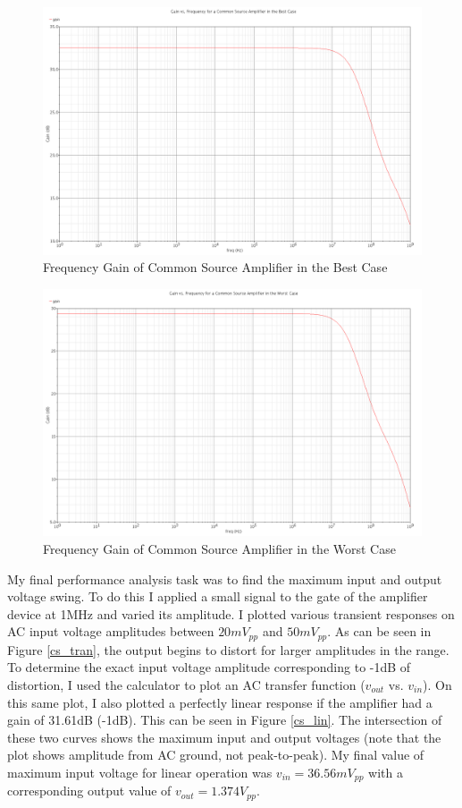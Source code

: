 \documentclass{article}
\begin{document}
\begin{figure}[H]
\centering
\includegraphics[width=6in]{2_cs_gain_ff.png}
\caption{Frequency Gain of Common Source Amplifier in the Best Case}
\label{cs_ff}
\end{figure}

\begin{figure}[H]
\centering
\includegraphics[width=6in]{2_cs_gain_ss.png}
\caption{Frequency Gain of Common Source Amplifier in the Worst Case}
\label{cs_ss}
\end{figure}

My final performance analysis task was to find the maximum input and output voltage swing. To do this I applied a small signal to the gate of the amplifier device at 1MHz and varied its amplitude. I plotted various transient responses on AC input voltage amplitudes between $20mV_{pp}$ and $50mV_{pp}$. As can be seen in Figure \ref{cs_tran}, the output begins to distort for larger amplitudes in the range. To determine the exact input voltage amplitude corresponding to -1dB of distortion, I used the calculator to plot an AC transfer function ($v_{out}$ vs. $v_{in}$). On this same plot, I also plotted a perfectly linear response if the amplifier had a gain of 31.61dB (-1dB). This can be seen in Figure \ref{cs_lin}. The intersection of these two curves shows the maximum input and output voltages (note that the plot shows amplitude from AC ground, not peak-to-peak). My final value of maximum input voltage for linear operation was $v_{in} = 36.56mV_{pp}$ with a corresponding output value of $v_{out} = 1.374V_{pp}$.
\end{document}
